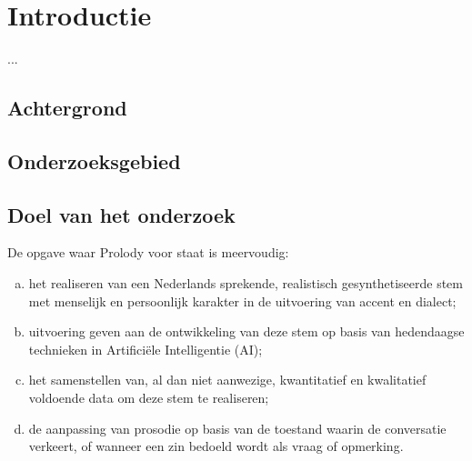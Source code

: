 \chapter{Introductie}

\begin{center}
  \begin{minipage}{0.5\textwidth}
    \begin{small}
      ...
    \end{small}
  \end{minipage}
  \vspace{0.5cm}
\end{center}

\section{Achtergrond}


\section{Onderzoeksgebied}


\section{Doel van het onderzoek}

De opgave waar Prolody voor staat is meervoudig:
\begin{enumerate}[a)]
    \item het realiseren van een Nederlands sprekende, realistisch gesynthetiseerde stem met menselijk en persoonlijk karakter in de uitvoering van accent en dialect;
    \item uitvoering geven aan de ontwikkeling van deze stem op basis van hedendaagse technieken in Artificiële Intelligentie (AI);
    \item het samenstellen van, al dan niet aanwezige, kwantitatief en kwalitatief voldoende data om deze stem te realiseren;
    \item de aanpassing van prosodie op basis van de toestand waarin de conversatie verkeert, of wanneer een zin bedoeld wordt als vraag of opmerking.
\end{enumerate}

